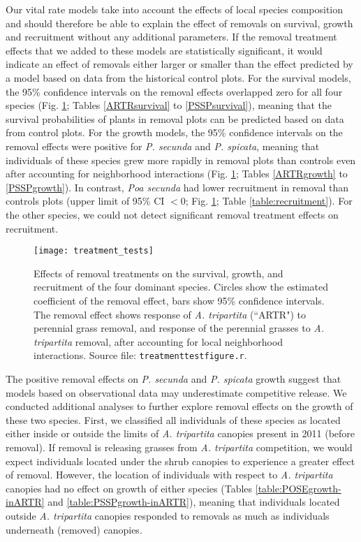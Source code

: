 \documentclass[11pt]{article}
\begin{document}
\begin{doublespacing}
Our vital rate models take into account the effects of local species composition and should therefore be able to explain the effect of removals on survival, growth and recruitment without any additional parameters. If the removal treatment effects that we added to these models are statistically significant, it would indicate an effect of removals either larger or smaller than the effect predicted by a model based on data from the historical control plots. For the survival models, the 95\% confidence intervals on the removal effects overlapped zero for all four species (Fig. \ref{fig:VitalRateTest}; Tables \ref{ARTRsurvival} to \ref{PSSPsurvival}), meaning that the survival probabilities of plants in removal plots can be predicted based on data from control plots. For the growth models, the 95\% confidence intervals on the removal effects were positive for \textit{P. secunda}  and \textit{P. spicata}, meaning that individuals of these species grew more rapidly in removal plots than controls even after accounting for neighborhood interactions (Fig. \ref{fig:VitalRateTest}; Tables \ref{ARTRgrowth} to \ref{PSSPgrowth}). In contrast, \textit{Poa secunda} had lower recruitment in removal than controls plots (upper limit of 95\% CI $<0$; Fig. \ref{fig:VitalRateTest}; Table \ref{table:recruitment}). For the other species, we could not detect significant removal treatment effects on recruitment.

 \begin{figure}[tbp]
 \centering
 \texttt{[image: treatment\_tests]}
 \caption{Effects of removal treatments on the survival, growth, and recruitment of the four dominant species. Circles show the estimated coefficient of the removal effect, bars show 95\% confidence intervals. The removal effect shows response of \textit{A. tripartita} (``ARTR") to perennial grass removal, and response of the perennial grasses to \textit{A. tripartita} removal, after accounting for local neighborhood interactions. 
 Source file: \texttt{treatment\textunderscore test\textunderscore figure.r}.}
 \label{fig:VitalRateTest}
 \end{figure}

The positive removal effects on \textit{P. secunda}  and \textit{P. spicata} growth suggest that models based on observational data may underestimate competitive release. We conducted additional analyses to further explore removal effects on the growth of these two species. First, we classified all individuals of these species as located either inside or outside the limits of \textit{A. tripartita} canopies present in 2011 (before removal). If removal is releasing grasses from \textit{A. tripartita} competition, we would expect individuals located under the shrub canopies to experience a greater effect of removal. However, the location of individuals with respect to \textit{A. tripartita} canopies had no effect on growth of either species (Tables \ref{table:POSEgrowth-inARTR} and \ref{table:PSSPgrowth-inARTR}), meaning that individuals located outside \textit{A. tripartita} canopies responded to removals as much as individuals underneath (removed) canopies. 


\end{doublespacing}
\end{document}
